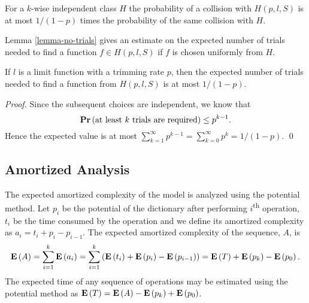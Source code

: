 For a $k$-wise independent class $H$ the probability of a collision with $H(p, l, S)$ is at most $1 / (1 - p)$ times the probability of the same collision with $H$.

Lemma \ref{lemma-no-trials} gives an estimate on the expected number of trials needed to find a function $f \in H(p, l, S)$ if $f$ is chosen uniformly from $H$.

\begin{lemma}
\label{lemma-no-trials}
If $l$ is a limit function with a trimming rate $p$, then the expected number of trials needed to find a function from $H(p, l, S)$ is at most ${1}/{(1 - p)}$.
\end{lemma}
\begin{proof}
Since the subsequent choices are independent, we know that \[\mathbf{Pr}\left(\mbox{at least }k\mbox{ trials are required}\right) \leq p^{k - 1}.\]
Hence the expected value is at most $\sum_{k = 1}^{\infty} p^{k - 1} = \sum_{k = 0}^{\infty} p^k = {1}/{(1 - p)}.$
\qed
\end{proof}

\subsection{Amortized Analysis}
The expected amortized complexity of the model is analyzed using the potential method. Let $p_i$ be the potential of the dictionary after performing $i$\textsuperscript{th} operation, $t_i$ be the time consumed by the operation and we define its amortized complexity as $a_i = t_i + p_i - p_{i - 1}$. The expected amortized complexity of the sequence, $A$, is
\[
\mathbf{E}\left(A\right) = \sum_{i=1}^{k} \mathbf{E}\left(a_i\right) = \sum_{i = 1}^{k} \left(\mathbf{E}\left(t_i\right) + \mathbf{E}\left(p_i\right) - \mathbf{E}\left(p_{i - 1}\right)\right) = \mathbf{E}\left(T\right) + \mathbf{E}\left(p_k\right) - \mathbf{E}\left(p_0\right).
\]
The expected time of any sequence of operations may be estimated using the potential method as $\mathbf{E}\left(T\right) = \mathbf{E}\left(A\right) - \mathbf{E}\left(p_k\right) + \mathbf{E}\left(p_0\right)$.

